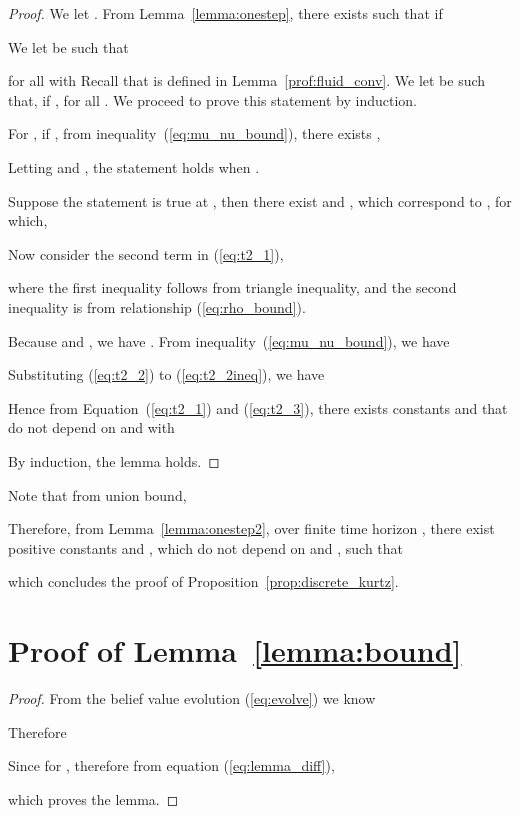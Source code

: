 \documentclass[11pt,twocolumn]{IEEEtran}
\begin{document}
\begin{proof}
We let . From Lemma~\ref{lemma:onestep}, there exists  such that if 


We let  be such that

for all  with 
Recall that  is defined in Lemma~\ref{prof:fluid_conv}. We let  be such that, if ,  for all . We proceed to prove this statement by induction.
\vspace{3pt}

For , if , from inequality~(\ref{eq:mu_nu_bound}), there exists ,


Letting  and , the statement holds when .

Suppose the statement is true at , then there exist  and , which correspond to , for which,


Now consider the second term in (\ref{eq:t2_1}),

where the first inequality follows from triangle inequality, and the second inequality is from relationship (\ref{eq:rho_bound}).

Because  and , we have . From inequality~(\ref{eq:mu_nu_bound}), we have


Substituting (\ref{eq:t2_2}) to (\ref{eq:t2_2ineq}), we have


Hence from Equation~(\ref{eq:t2_1}) and (\ref{eq:t2_3}), there exists constants  and  that do not depend on  and  with


By induction, the lemma holds.
\end{proof}
\vspace{3pt}

Note that from union bound,


Therefore, from Lemma~\ref{lemma:onestep2}, over finite time horizon , there exist positive constants  and , which do not depend on  and , such that

which concludes the proof of Proposition~\ref{prop:discrete_kurtz}.

\vspace{5pt}


\section{Proof of Lemma~\ref{lemma:bound}}
\label{appen:bound}

\begin{proof}
From the belief value evolution (\ref{eq:evolve}) we know


Therefore


Since  for , therefore from equation (\ref{eq:lemma_diff}),

which proves the lemma.
\end{proof}
\end{document}
